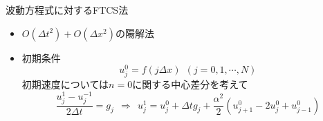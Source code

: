 \begin{frame}[t]{波動方程式に対するFTCS法}
  \begin{itemize}
  \item $O(\Delta t^2) + O(\Delta x^2)$の陽解法
    \begin{center}
    \end{center}
  \item 初期条件
    \[
    u_j^0 = f(j\Delta x) \ \ (j=0,1,\cdots,N)
    \]
    初期速度については$n=0$に関する中心差分を考えて
    \[
    \frac{u_j^1 - u_j^{-1}}{2 \Delta t} = g_j \ \ \Rightarrow \ \ u_j^1 = u_j^0 + \Delta t g_j + \frac{\alpha^2}{2} (u_{j+1}^{0} - 2 u_{j}^{0} + u_{j-1}^{0})
    \]
  \end{itemize}
\end{frame}
